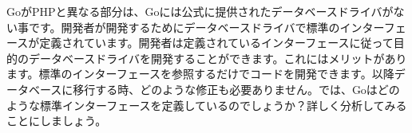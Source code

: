 GoがPHPと異なる部分は、Goには公式に提供されたデータベースドライバがない事です。開発者が開発するためにデータベースドライバで標準のインターフェースが定義されています。開発者は定義されているインターフェースに従って目的のデータベースドライバを開発することができます。これにはメリットがあります。標準のインターフェースを参照するだけでコードを開発できます。以降データベースに移行する時、どのような修正も必要ありません。では、Goはどのような標準インターフェースを定義しているのでしょうか？詳しく分析してみることにしましょう。
